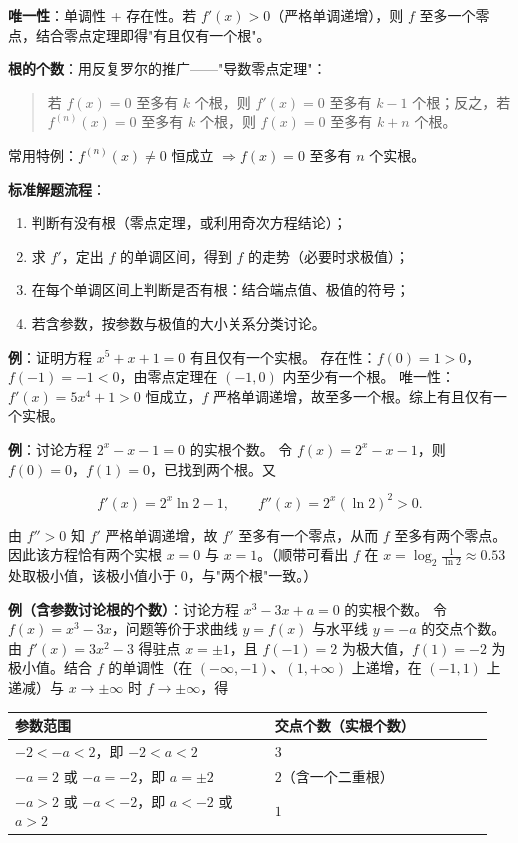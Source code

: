 \documentclass[11pt,openany,UTF8]{ctexbook}
\begin{document}
\textbf{唯一性}：单调性 + 存在性。若 $f'(x)>0$（严格单调递增），则 $f$ 至多一个零点，结合零点定理即得"有且仅有一个根"。

\textbf{根的个数}：用反复罗尔的推广——"导数零点定理"：

\begin{quote}
若 $f(x)=0$ 至多有 $k$ 个根，则 $f'(x)=0$ 至多有 $k-1$ 个根；反之，若 $f^{(n)}(x)=0$ 至多有 $k$ 个根，则 $f(x)=0$ 至多有 $k+n$ 个根。

\end{quote}
常用特例：$f^{(n)}(x)\ne0$ 恒成立 $\Rightarrow f(x)=0$ 至多有 $n$ 个实根。

\textbf{标准解题流程}：

\begin{enumerate}
\item 判断有没有根（零点定理，或利用奇次方程结论）；
\item 求 $f'$，定出 $f$ 的单调区间，得到 $f$ 的走势（必要时求极值）；
\item 在每个单调区间上判断是否有根：结合端点值、极值的符号；
\item 若含参数，按参数与极值的大小关系分类讨论。
\end{enumerate}
\textbf{例}：证明方程 $x^5+x+1=0$ 有且仅有一个实根。 存在性：$f(0)=1>0$，$f(-1)=-1<0$，由零点定理在 $(-1,0)$ 内至少有一个根。 唯一性：$f'(x)=5x^4+1>0$ 恒成立，$f$ 严格单调递增，故至多一个根。综上有且仅有一个实根。

\textbf{例}：讨论方程 $2^x-x-1=0$ 的实根个数。 令 $f(x)=2^x-x-1$，则 $f(0)=0$，$f(1)=0$，已找到两个根。又

\[f'(x)=2^x\ln 2-1,\qquad f''(x)=2^x(\ln 2)^2>0 .\]

由 $f''>0$ 知 $f'$ 严格单调递增，故 $f'$ 至多有一个零点，从而 $f$ 至多有两个零点。因此该方程恰有两个实根 $x=0$ 与 $x=1$。（顺带可看出 $f$ 在 $x=\log_2\frac{1}{\ln 2}\approx0.53$ 处取极小值，该极小值小于 $0$，与"两个根"一致。）

\textbf{例（含参数讨论根的个数）}：讨论方程 $x^3-3x+a=0$ 的实根个数。 令 $f(x)=x^3-3x$，问题等价于求曲线 $y=f(x)$ 与水平线 $y=-a$ 的交点个数。由 $f'(x)=3x^2-3$ 得驻点 $x=\pm1$，且 $f(-1)=2$ 为极大值，$f(1)=-2$ 为极小值。结合 $f$ 的单调性（在 $(-\infty,-1)$、$(1,+\infty)$ 上递增，在 $(-1,1)$ 上递减）与 $x\to\pm\infty$ 时 $f\to\pm\infty$，得

\begingroup\small\setlength{\tabcolsep}{4.0pt}
\begin{longtable}{@{}L{0.5109\linewidth}L{0.4348\linewidth}@{}}
\toprule
\textbf{参数范围} & \textbf{交点个数（实根个数）} \\
\midrule
\endhead
$-2<-a<2$，即 $-2<a<2$ & $3$ \\
$-a=2$ 或 $-a=-2$，即 $a=\pm2$ & $2$（含一个二重根） \\
$-a>2$ 或 $-a<-2$，即 $a<-2$ 或 $a>2$ & $1$ \\
\bottomrule
\end{longtable}
\endgroup
\end{document}
